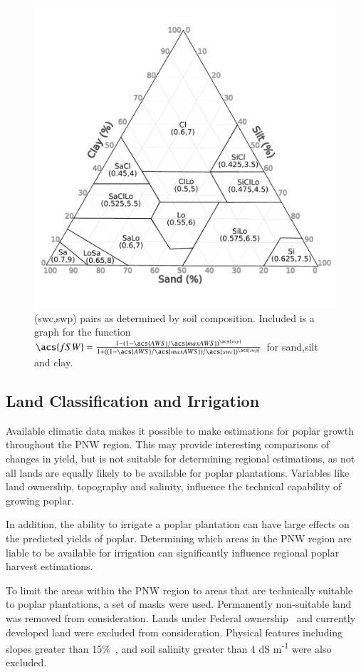 \documentclass[preprint,review,12pt]{elsarticle}
\begin{document}
\begin{figure}
  \centering
  \includegraphics[width=0.52\linewidth]{soil_triangle}
  
  \caption{(\acs{swc},\acs{swp}) pairs as determined by soil
    composition.  Included is a graph for the function $\acs{fSW} =
    \frac{1-(1-\acs{AWS}/\acs{maxAWS})^{\acs{swp}}}{1+((1-\acs{AWS}/\acs{maxAWS})/\acs{swc})^{\acs{swp}}}$
    for sand,silt and clay. }
  \label{fig:soil-triangle}
\end{figure}

\subsection{Land Classification and Irrigation}
\label{sec:land}

Available climatic data makes it possible to make estimations for
poplar growth throughout the \ac{PNW} region.  This may provide
interesting comparisons of changes in yield, but is not suitable
for determining regional estimations, as not all lands are equally likely
to be available for poplar plantations.  Variables like land
ownership, topography and salinity, influence the technical capability
of growing poplar.  

In addition, the ability to irrigate a poplar plantation can have
large effects on the predicted yields of poplar.  Determining which
areas in the \ac{PNW} region are liable to be available for irrigation
can significantly influence regional poplar harvest estimations.  

To limit the areas within the \ac{PNW} region to areas that are
technically suitable to poplar plantations, a set of masks were used.
Permanently non-suitable land was removed from consideration. Lands
under Federal ownership~\cite{NationalAtlasoftheUnitedStates2013} and
currently developed land were excluded from consideration.  Physical
features including slopes greater than 15\%~\cite{Gesch2007}, and soil
salinity greater than 4 dS m\textsuperscript{-1} were also
excluded.
\end{document}

